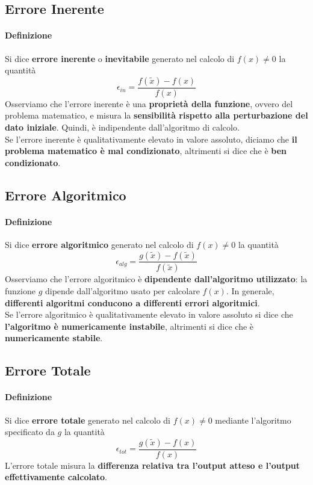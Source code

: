 \documentclass[10pt]{book}
\begin{document}
\subsection{Errore Inerente}
\paragraph{Definizione} Si dice \textbf{errore inerente} o \textbf{inevitabile} generato nel calcolo di $f(x) \neq 0$ la quantità $$\epsilon_{in} = \frac{f(\tilde{x}) - f(x)}{f(x)}$$
Osserviamo che l'errore inerente è una \textbf{proprietà della funzione}, ovvero del problema matematico, e misura la \textbf{sensibilità rispetto alla perturbazione del dato iniziale}. Quindi, è indipendente dall'algoritmo di calcolo.\\
Se l'errore inerente è qualitativamente elevato in valore assoluto, diciamo che \textbf{il problema matematico è mal condizionato}, altrimenti si dice che è \textbf{ben condizionato}.
\subsection{Errore Algoritmico}
\paragraph{Definizione} Si dice \textbf{errore algoritmico} generato nel calcolo di $f(x) \neq 0$ la quantità $$\epsilon_{alg} = \frac{g(\tilde{x}) - f(\tilde{x})}{f(\tilde{x})}$$
Osserviamo che l'errore algoritmico è \textbf{dipendente dall'algoritmo utilizzato}: la funzione $g$ dipende dall'algoritmo usato per calcolare $f(x)$. In generale, \textbf{differenti algoritmi conducono a differenti errori algoritmici}.\\
Se l'errore algoritmico è qualitativamente elevato in valore assoluto si dice che \textbf{l'algoritmo è numericamente instabile}, altrimenti si dice che è \textbf{numericamente stabile}.
\pagebreak
\subsection{Errore Totale}
\paragraph{Definizione} Si dice \textbf{errore totale} generato nel calcolo di $f(x) \neq 0$ mediante l'algoritmo specificato da $g$ la quantità $$\epsilon_{tot} = \frac{g(\tilde{x}) - f(x)}{f(x)}$$ L'errore totale misura la \textbf{differenza relativa tra l'output atteso e l'output effettivamente calcolato}.
\end{document}
